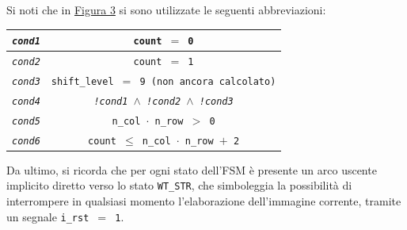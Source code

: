 \documentclass{article}
\begin{document}
Si noti che in \hyperref[fig:fsm]{Figura 3} si sono utilizzate le seguenti abbreviazioni:
\vspace{-.1cm}
\begin{center}
    \def\arraystretch{1.2} %
    \begin{tabular}{||c|c||}
        \hline
        \texttt{\emph{cond1}} & \texttt{count $=$ 0}                                                 \\\hline
        \texttt{\emph{cond2}} & \texttt{count $=$ 1}                                                 \\\hline
        \texttt{\emph{cond3}} & \texttt{shift\_level $=$ 9 (non ancora calcolato)}                   \\\hline
        \texttt{\emph{cond4}} & \texttt{\emph{!cond1} $\wedge$ \emph{!cond2} $\wedge$ \emph{!cond3}} \\\hline
        \texttt{\emph{cond5}} & \texttt{n\_col $\cdot$ n\_row $>$ 0}                                 \\\hline
        \texttt{\emph{cond6}} & \texttt{count $\leq$ n\_col $\cdot$ n\_row $+$ 2}                    \\\hline
    \end{tabular}
\end{center}
\vspace{0,2cm}

Da ultimo, si ricorda che per ogni stato dell'FSM è presente un arco uscente implicito diretto verso lo stato \texttt{WT\_STR}, che simboleggia la possibilità di interrompere in qualsiasi momento l'elaborazione dell'immagine corrente, tramite un segnale \texttt{i\_rst $=$ 1}.
\vspace{0,2cm}
\end{document}
